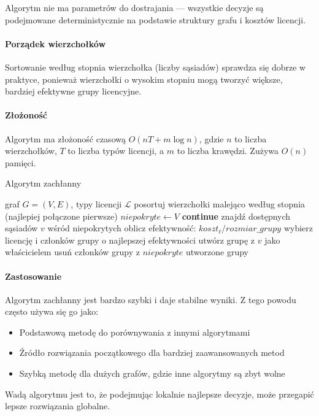 Algorytm nie ma parametrów do dostrajania — wszystkie decyzje są podejmowane deterministycznie na podstawie struktury grafu i kosztów licencji.

\paragraph{Porządek wierzchołków}
Sortowanie według stopnia wierzchołka (liczby sąsiadów) sprawdza się dobrze w praktyce, ponieważ wierzchołki o wysokim stopniu mogą tworzyć większe, bardziej efektywne grupy licencyjne.

\paragraph{Złożoność}
Algorytm ma złożoność czasową $O(nT + m\log n)$, gdzie $n$ to liczba wierzchołków, $T$ to liczba typów licencji, a $m$ to liczba krawędzi. Zużywa $O(n)$ pamięci.

\begin{algorithm}[H]
\caption{Algorytm zachłanny}
\label{alg:greedy}
\begin{algorithmic}[1]
\Require graf $G=(V,E)$, typy licencji $\mathcal{L}$
\State posortuj wierzchołki malejąco według stopnia (najlepiej połączone pierwsze)
\State $niepokryte \gets V$
   \textbf{continue} \EndIf
  \State znajdź dostępnych sąsiadów $v$ wśród niepokrytych
    \State oblicz efektywność: $koszt_\ell / rozmiar\_grupy$
  \EndFor
  \State wybierz licencję i członków grupy o najlepszej efektywności
  \State utwórz grupę z $v$ jako właścicielem
  \State usuń członków grupy z $niepokryte$
\EndFor
\State \Return utworzone grupy
\end{algorithmic}
\end{algorithm}

\paragraph{Zastosowanie}
Algorytm zachłanny jest bardzo szybki i daje stabilne wyniki. Z tego powodu często używa się go jako:
\begin{itemize}
  \item Podstawową metodę do porównywania z innymi algorytmami
  \item Źródło rozwiązania początkowego dla bardziej zaawansowanych metod
  \item Szybką metodę dla dużych grafów, gdzie inne algorytmy są zbyt wolne
\end{itemize}
Wadą algorytmu jest to, że podejmując lokalnie najlepsze decyzje, może przegapić lepsze rozwiązania globalne.


